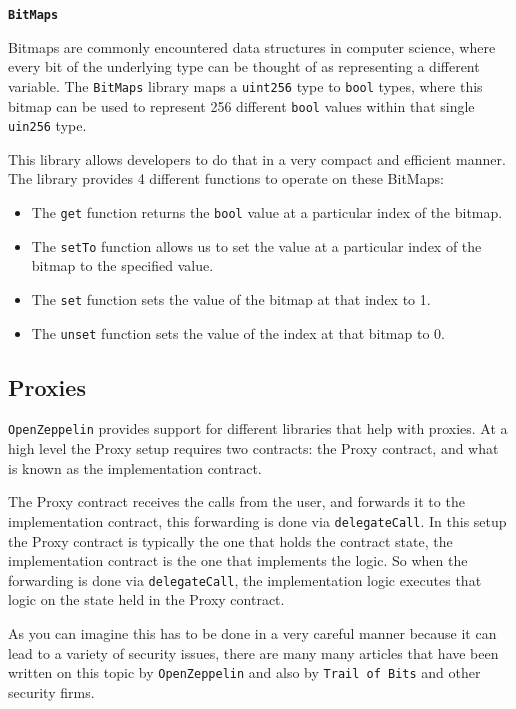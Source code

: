 \textbf{\texttt{BitMaps}}

Bitmaps are commonly encountered data structures in computer science,
where every bit of the underlying type can be thought of as representing
a different variable. The \texttt{BitMaps} library maps a
\texttt{uint256} type to \texttt{bool} types, where this bitmap can be
used to represent 256 different \texttt{bool} values within that single
\texttt{uin256} type.

This library allows developers to do that in a very compact and
efficient manner. The library provides 4 different functions to operate
on these BitMaps:

\begin{itemize}
\tightlist
\item
  The \texttt{get} function returns the \texttt{bool} value at a
  particular index of the bitmap.
\item
  The \texttt{setTo} function allows us to set the value at a particular
  index of the bitmap to the specified value.
\item
  The \texttt{set} function sets the value of the bitmap at that index
  to 1.
\item
  The \texttt{unset} function sets the value of the index at that bitmap
  to 0.
\end{itemize}

\subsection{Proxies}\label{proxies}

\texttt{OpenZeppelin} provides support for different libraries that help
with proxies. At a high level the Proxy setup requires two contracts:
the Proxy contract, and what is known as the implementation contract.

The Proxy contract receives the calls from the user, and forwards it to
the implementation contract, this forwarding is done via
\texttt{delegateCall}. In this setup the Proxy contract is typically the
one that holds the contract state, the implementation contract is the
one that implements the logic. So when the forwarding is done via
\texttt{delegateCall}, the implementation logic executes that logic on
the state held in the Proxy contract.

As you can imagine this has to be done in a very careful manner because
it can lead to a variety of security issues, there are many many
articles that have been written on this topic by \texttt{OpenZeppelin}
and also by \texttt{Trail\ of\ Bits} and other security firms.

